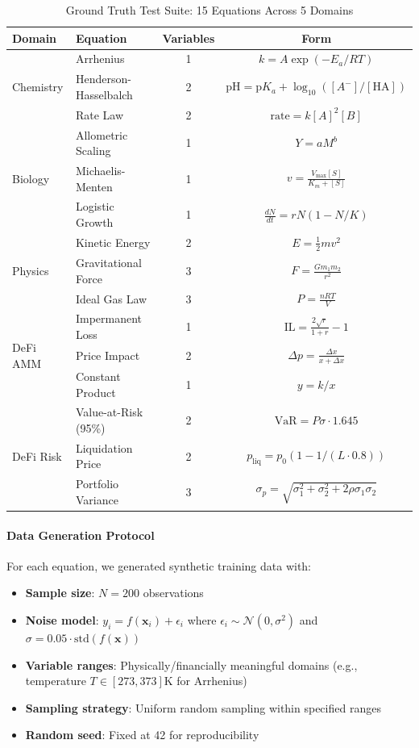 \documentclass[twoside,11pt]{article}
\begin{document}
\begin{table}[htbp]
\centering
\caption{Ground Truth Test Suite: 15 Equations Across 5 Domains}
\label{tab:test_suite}
\small
\begin{tabular}{llcc}
\toprule
\textbf{Domain} & \textbf{Equation} & \textbf{Variables} & \textbf{Form} \\
\midrule
\multirow{3}{*}{Chemistry}
& Arrhenius & 1 & $k = A\exp(-E_a/RT)$ \\
& Henderson-Hasselbalch & 2 & $\text{pH} = \text{p}K_a + \log_{10}([A^-]/[\text{HA}])$ \\
& Rate Law & 2 & $\text{rate} = k[A]^2[B]$ \\
\midrule
\multirow{3}{*}{Biology}
& Allometric Scaling & 1 & $Y = aM^b$ \\
& Michaelis-Menten & 1 & $v = \frac{V_{\max}[S]}{K_m + [S]}$ \\
& Logistic Growth & 1 & $\frac{dN}{dt} = rN(1 - N/K)$ \\
\midrule
\multirow{3}{*}{Physics}
& Kinetic Energy & 2 & $E = \frac{1}{2}mv^2$ \\
& Gravitational Force & 3 & $F = \frac{Gm_1m_2}{r^2}$ \\
& Ideal Gas Law & 3 & $P = \frac{nRT}{V}$ \\
\midrule
\multirow{3}{*}{DeFi AMM}
& Impermanent Loss & 1 & $\text{IL} = \frac{2\sqrt{r}}{1+r} - 1$ \\
& Price Impact & 2 & $\Delta p = \frac{\Delta x}{x + \Delta x}$ \\
& Constant Product & 1 & $y = k/x$ \\
\midrule
\multirow{3}{*}{DeFi Risk}
& Value-at-Risk (95\%) & 2 & $\text{VaR} = P\sigma \cdot 1.645$ \\
& Liquidation Price & 2 & $p_{\text{liq}} = p_0(1 - 1/(L \cdot 0.8))$ \\
& Portfolio Variance & 3 & $\sigma_p = \sqrt{\sigma_1^2 + \sigma_2^2 + 2\rho\sigma_1\sigma_2}$ \\
\bottomrule
\end{tabular}
\end{table}

\paragraph{Data Generation Protocol}

For each equation, we generated synthetic training data with:
\begin{itemize}
    \item \textbf{Sample size}: $N = 200$ observations
    \item \textbf{Noise model}: $y_i = f(\mathbf{x}_i) + \epsilon_i$ where $\epsilon_i \sim \mathcal{N}(0, \sigma^2)$ and $\sigma = 0.05 \cdot \text{std}(f(\mathbf{x}))$
    \item \textbf{Variable ranges}: Physically/financially meaningful domains (e.g., temperature $T \in [273, 373]$K for Arrhenius)
    \item \textbf{Sampling strategy}: Uniform random sampling within specified ranges
    \item \textbf{Random seed}: Fixed at 42 for reproducibility
\end{itemize}
\end{document}
